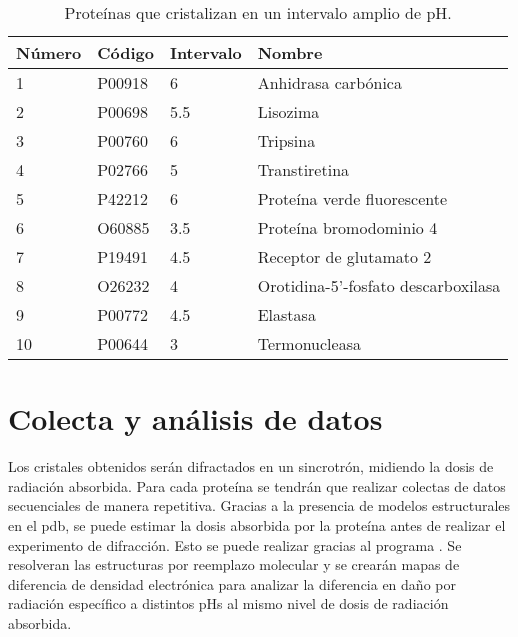 \begin{table}[h]
	\centering
	\begin{tabular}{@{}llll@{}}
		\toprule
		Número & Código & Intervalo       & Nombre                              \\ \midrule
		1      & P00918 & 6               & Anhidrasa carbónica                 \\
		2      & P00698 & 5.5             & Lisozima                            \\
		3      & P00760 & 6               & Tripsina                            \\
		4      & P02766 & 5               & Transtiretina                       \\
		5      & P42212 & 6               & Proteína verde fluorescente         \\
		6      & O60885 & 3.5             & Proteína bromodominio 4             \\
		7      & P19491 & 4.5             & Receptor de glutamato 2             \\
		8      & O26232 & 4               & Orotidina-5’-fosfato descarboxilasa \\
		9      & P00772 & 4.5             & Elastasa                            \\
		10     & P00644 & 3               & Termonucleasa                       \\
\bottomrule
	\end{tabular}
	\caption[Proteínas que cristalizan en un intervalo amplio de pH]{Proteínas que cristalizan en un intervalo amplio de pH.}
\end{table}

\section{Colecta y análisis de datos}
Los cristales obtenidos serán difractados en un sincrotrón, midiendo la dosis de radiación absorbida. Para cada proteína se tendrán que realizar colectas de datos secuenciales de manera repetitiva. Gracias a la presencia de modelos estructurales en el \acrshort{pdb}, se puede estimar la dosis absorbida por la proteína antes de realizar el experimento de difracción. Esto se puede realizar gracias al programa  . Se resolveran las estructuras por reemplazo molecular y se crearán mapas de diferencia de densidad electrónica para analizar la diferencia en daño por radiación específico a distintos pHs al mismo nivel de dosis de radiación absorbida. %